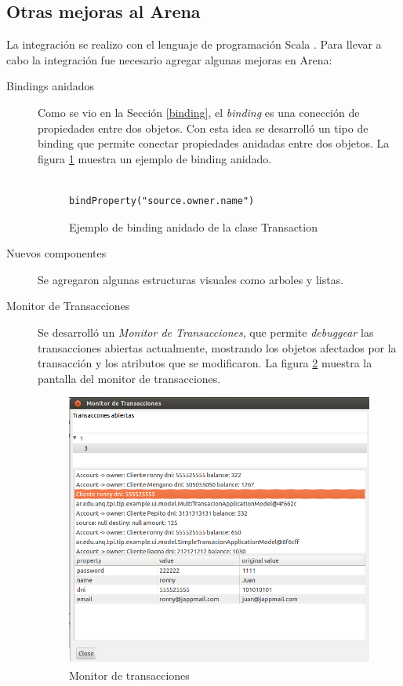 \subsection{Otras mejoras al Arena}
	La integración se realizo con el lenguaje de programación Scala
	\cite{OderskySpoonVenners08}. Para llevar a cabo la integración fue necesario agregar algunas
	mejoras en Arena:
	\begin{description}

	  \item[Bindings anidados] Como se vio en la Sección \ref{binding},
		  el \emph{binding} es una conección de propiedades entre dos objetos. Con
		  esta idea se desarrolló un tipo de binding que permite conectar propiedades
		  anidadas entre dos objetos. La figura \ref{bindAnidado} muestra un ejemplo de binding anidado.

			\begin{figure}[h]
			\centering
					\begin{lstlisting}
						bindProperty("source.owner.name") 
					\end{lstlisting}
			\caption{Ejemplo de binding anidado de la clase Transaction}
			\label{bindAnidado}
		\end{figure}	

	  \item[Nuevos componentes] Se agregaron algunas estructuras visuales como
	  arboles y listas.

  	  \item[Monitor de Transacciones]
		 Se desarrolló un \emph{Monitor de Transacciones}, que permite
		 \emph{debuggear} las transacciones abiertas actualmente, mostrando
		 los objetos afectados por la transacción y los atributos que se
		 modificaron.
		La figura \ref{monitor} muestra la pantalla del monitor de transacciones.
		
		\begin{figure}[h]
			\centering
			\includegraphics[scale=0.5]{img/monitorTransacciones.png}
			\caption{Monitor de transacciones}
			\label{monitor}
		\end{figure}	
	  \item[]
	\end{description}
